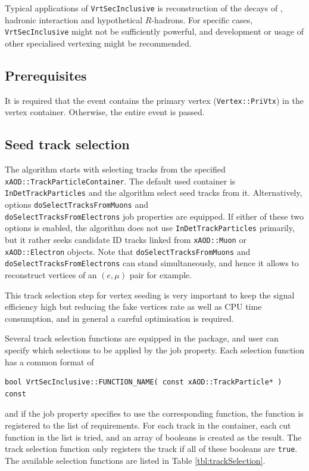 \documentclass[NOTE, atlasdraft=true, texlive=2018, UKenglish]{\ATLASLATEXPATH atlasdoc}
\begin{document}
Typical applications of {\tt VrtSecInclusive} is reconstruction of the decays of \Kshort, hadronic interaction and hypothetical $R$-hadrons. For specific cases, {\tt VrtSecInclusive} might not be sufficiently powerful, and development or usage of other specialised vertexing might be recommended.

\subsection{Prerequisites}
It is required that the event contains the primary vertex ({\tt Vertex::PriVtx}) in the vertex container. Otherwise, the entire event is passed.

\subsection{Seed track selection}
The algorithm starts with selecting tracks from the specified {\tt xAOD::TrackParticleContainer}. The default used container is {\tt InDetTrackParticles} and the algorithm select seed tracks from it. Alternatively, options {\tt doSelectTracksFromMuons} and\\ {\tt doSelectTracksFromElectrons} job properties are equipped. If either of these two options is enabled, the algorithm does not use {\tt InDetTrackParticles} primarily, but it rather seeks candidate ID tracks linked from {\tt xAOD::Muon} or {\tt xAOD::Electron} objects. Note that {\tt doSelectTracksFromMuons} and {\tt doSelectTracksFromElectrons} can stand simultaneously, and hence it allows to reconstruct vertices of an $(e,\mu)$ pair for example.

This track selection step for vertex seeding is very important to keep the signal efficiency high but reducing the fake vertices rate as well as CPU time consumption, and in general a careful optimisation is required.

Several track selection functions are equipped in the package, and user can specify which selections to be applied by the job property. Each selection function has a common format of
\begin{scriptsize}
\begin{verbatim}
bool VrtSecInclusive::FUNCTION_NAME( const xAOD::TrackParticle* ) const
\end{verbatim}
\end{scriptsize}

and if the job property specifies to use the corresponding function, the function is registered to the list of requirements. For each track in the container, each cut function in the list is tried, and an array of booleans is created as the result. The track selection function only registers the track if all of these booleans are {\tt true}. The available selection functions are listed in Table \ref{tbl:trackSelection}.
\end{document}
